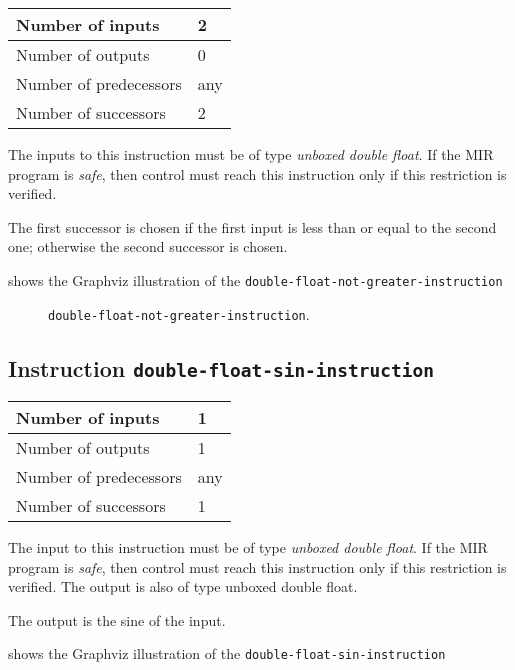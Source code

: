 \begin{tabular}{|l|l|}
\hline
Number of inputs & 2\\
\hline
Number of outputs & 0\\
\hline
Number of predecessors & any\\
\hline
Number of successors & 2\\
\hline
\end{tabular}

The inputs to this instruction must be of type \emph{unboxed double
  float}.  If the MIR program is \emph{safe}, then control must reach
this instruction only if this restriction is verified.

The first successor is chosen if the first input is less than or equal
to the second one; otherwise the second successor is chosen.

 shows the Graphviz illustration of the
\texttt{double-float-not-greater-instruction}

\begin{figure}
\begin{center}
\end{center}
\caption{\label{fig-double-float-not-greater-instruction}
\texttt{double-float-not-greater-instruction}.}
\end{figure}

\subsection{Instruction \texttt{double-float-sin-instruction}}
\label{mir-instruction-double-float-div}

\begin{tabular}{|l|l|}
\hline
Number of inputs & 1\\
\hline
Number of outputs & 1\\
\hline
Number of predecessors & any\\
\hline
Number of successors & 1\\
\hline
\end{tabular}

The input to this instruction must be of type \emph{unboxed double
  float}.  If the MIR program is \emph{safe}, then control must reach
this instruction only if this restriction is verified.  The output is
also of type unboxed double float.

The output is the sine of the input.

 shows the Graphviz illustration of the
\texttt{double-float-sin-instruction}

